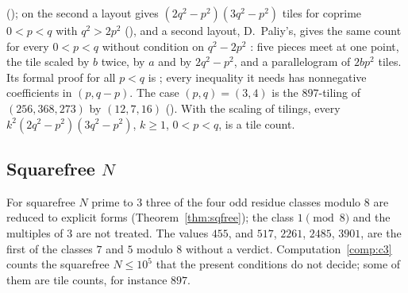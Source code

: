 \documentclass[11pt,reqno]{amsart}
\theoremstyle{plain}
\theoremstyle{definition}
\begin{document}
\begin{itemize}
(); on the second a layout gives $(2q^2-p^2)(3q^2-p^2)$ tiles for
coprime $0<p<q$ with $q^2>2p^2$ (), and a second layout, D.~Paliy's, gives the same
count for every $0<p<q$ without condition on $q^2-2p^2$ \cite{PaliyTilings}: five pieces meet at one point, the
tile scaled by $b$ twice, by $a$ and by $2q^2-p^2$, and a parallelogram of $2bp^2$ tiles. Its formal proof for all
$p<q$ is ; every inequality it needs has nonnegative coefficients in $(p,q-p)$. The case
$(p,q)=(3,4)$ is the $897$-tiling of $(256,368,273)$ by $(12,7,16)$ (). With the scaling of tilings, every
$k^2(2q^2-p^2)(3q^2-p^2)$, $k\ge1$, $0<p<q$, is a tile count.
\end{itemize}

\subsection{Squarefree $N$}
For squarefree $N$ prime to $3$ three of the four odd residue classes modulo $8$ are reduced to explicit
forms (Theorem~\ref{thm:sqfree}); the class $1\pmod8$ and the multiples of $3$ are not treated. The values
$455$, and $517$, $2261$, $2485$, $3901$, are the first of the classes $7$ and $5$ modulo $8$ without a
verdict. Computation~\ref{comp:c3} counts the squarefree $N\le10^5$ that the present conditions do not
decide; some of them are tile counts, for instance $897$.
\end{document}
